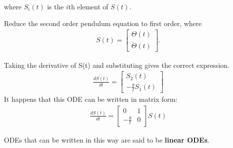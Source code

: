where $S_i(t)$ is the $i$th element of $S(t)$. 

\begin{example}
Reduce the second order pendulum equation to first order, where
\[\begin{split}
S(t) =\left[\begin{array}{c}
\Theta(t) \\
\dot{\Theta}(t)
\end{array}\right].
\end{split}\]
\end{example}

\begin{mysolution}
Taking the derivative of S(t) and substituting gives the correct expression.
\[\begin{split}
\frac{dS(t)}{dt} =\left[\begin{array}{c}
S_2(t) \\
-\frac{g}{l}S_1(t)
\end{array}\right]
\end{split}\]
It happens that this ODE can be written in matrix form:
\[\begin{split}
\frac{dS(t)}{dt} =\left[\begin{array}{cc}
0 & 1 \\
-\frac{g}{l} & 0
\end{array}\right]S(t)
\end{split}\]
\end{mysolution}

ODEs that can be written in this way are said to be {\bf linear ODEs}.

